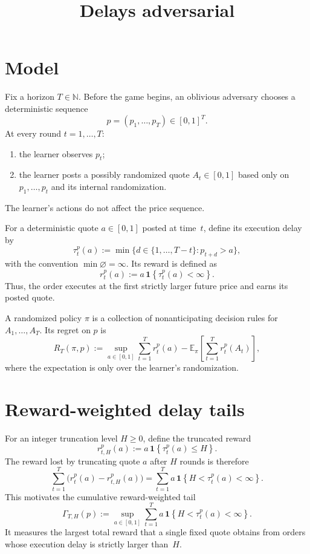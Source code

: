 \documentclass[11pt]{article}
\title{Delays adversarial}
\author{}
\date{}
\theoremstyle{remark}
\newcommand{\ind}[1]{\mathbf{1}\!\left\{#1\right\}}
\newcommand{\E}{\mathbb{E}}
\newcommand{\N}{\mathbb{N}}
\newcommand{\Tau}{\tau}
\newcommand{\GammaTail}{\Gamma}
\begin{document}
\maketitle

\section{Model}

Fix a horizon $T\in\N$.  Before the game begins, an oblivious adversary chooses a
deterministic sequence
\[
    p=(p_1,\ldots,p_T)\in[0,1]^T.
\]
At every round $t=1,\ldots,T$:
\begin{enumerate}[label=(\arabic*)]
    \item the learner observes $p_t$;
    \item the learner posts a possibly randomized quote $A_t\in[0,1]$ based only
    on $p_1,\ldots,p_t$ and its internal randomization.
\end{enumerate}
The learner's actions do not affect the price sequence.

For a deterministic quote $a\in[0,1]$ posted at time~$t$, define its execution
delay by
\[
    \Tau_t^p(a)
    :=
    \min\bigl\{d\in\{1,\ldots,T-t\}:p_{t+d}>a\bigr\},
\]
with the convention $\min\varnothing=\infty$.  Its reward is defined as
\[
    r_t^p(a)
    :=
    a\,\ind{\Tau_t^p(a)<\infty}.
\]
Thus, the order executes at the first strictly larger future price and earns its
posted quote.

A randomized policy $\pi$ is a collection of nonanticipating decision rules for
$A_1,\ldots,A_T$.  Its regret on $p$ is
\begin{equation}\label{eq:regret}
    R_T(\pi,p)
    :=
    \sup_{a\in[0,1]}
    \sum_{t=1}^T r_t^p(a)
    -
    \E_\pi\!\left[\sum_{t=1}^T r_t^p(A_t)\right],
\end{equation}
where the expectation is only over the learner's randomization.

\section{Reward-weighted delay tails}

For an integer truncation level $H\ge 0$, define the truncated reward
\[
    r_{t,H}^p(a)
    :=
    a\,\ind{\Tau_t^p(a)\le H}.
\]
The reward lost by truncating quote $a$ after $H$ rounds is therefore
\[
    \sum_{t=1}^T\bigl(r_t^p(a)-r_{t,H}^p(a)\bigr)
    =
    \sum_{t=1}^T
    a\,\ind{H<\Tau_t^p(a)<\infty}.
\]
This motivates the cumulative reward-weighted tail
\begin{equation}\label{eq:Gamma}
    \GammaTail_{T,H}(p)
    :=
    \sup_{a\in[0,1]}
    \sum_{t=1}^T
    a\,\ind{H<\Tau_t^p(a)<\infty}.
\end{equation}
It measures the largest total reward that a single fixed quote obtains from
orders whose execution delay is strictly larger than~$H$.
\end{document}
